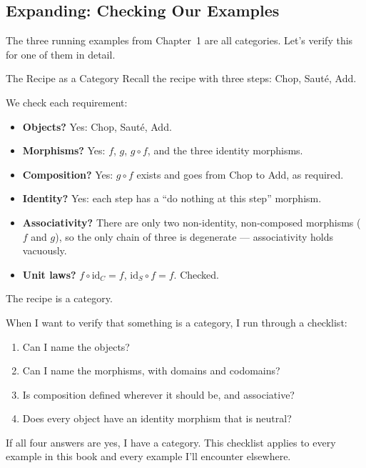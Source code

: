 \subsection{Expanding: Checking Our Examples}

The three running examples from Chapter~1 are all categories. Let's verify
this for one of them in detail.

\begin{example}{The Recipe as a Category}
Recall the recipe with three steps: Chop, Sauté, Add.

\medskip
\begin{center}
\end{center}
\medskip

We check each requirement:

\begin{itemize}
  \item \textbf{Objects?} Yes: Chop, Sauté, Add.
  \item \textbf{Morphisms?} Yes: $f$, $g$, $g \circ f$, and the three
        identity morphisms.
  \item \textbf{Composition?} Yes: $g \circ f$ exists and goes from Chop
        to Add, as required.
  \item \textbf{Identity?} Yes: each step has a ``do nothing at this step''
        morphism.
  \item \textbf{Associativity?} There are only two non-identity, non-composed
        morphisms ($f$ and $g$), so the only chain of three is degenerate ---
        associativity holds vacuously.
  \item \textbf{Unit laws?} $f \circ \mathrm{id}_C = f$,\;
        $\mathrm{id}_S \circ f = f$. Checked.
\end{itemize}

The recipe is a category.
\end{example}

\begin{dialog}
When I want to verify that something is a category, I run through a
checklist:
\begin{enumerate}
  \item Can I name the objects?
  \item Can I name the morphisms, with domains and codomains?
  \item Is composition defined wherever it should be, and associative?
  \item Does every object have an identity morphism that is neutral?
\end{enumerate}
If all four answers are yes, I have a category. This checklist applies
to every example in this book and every example I'll encounter elsewhere.
\end{dialog}

